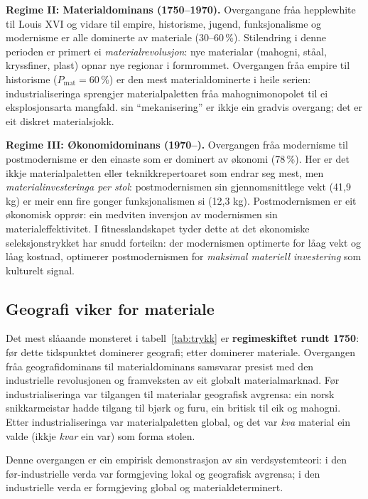 \documentclass[10pt, a4paper, twocolumn]{article}
\begin{document}
\textbf{Regime II: Materialdominans (1750--1970).} Overgangane fr\r{a}a hepplewhite til Louis XVI og vidare til empire, historisme, jugend, funksjonalisme og modernisme er alle dominerte av materiale (30--60\,\%). Stilendring i denne perioden er primert ei \emph{materialrevolusjon}: nye materialar (mahogni, st\r{a}al, kryssfiner, plast) opnar nye regionar i formrommet. Overgangen fr\r{a}a empire til historisme ($P_{\text{mat}} = 60$\,\%) er den mest materialdominerte i heile serien: industrialiseringa sprengjer materialpaletten fr\r{a}a mahognimonopolet til ei eksplosjonsarta mangfald. \citet{giedion1948} sin ``mekanisering'' er ikkje ein gradvis overgang; det er eit diskret materialsjokk.

\textbf{Regime III: \O konomidominans (1970--).} Overgangen fr\r{a}a modernisme til postmodernisme er den einaste som er dominert av \o konomi (78\,\%). Her er det ikkje materialpaletten eller teknikkrepertoaret som endrar seg mest, men \emph{materialinvesteringa per stol}: postmodernismen sin gjennomsnittlege vekt (41{,}9 kg) er meir enn fire gonger funksjonalismen si (12{,}3 kg). Postmodernismen er eit \o konomisk oppr\o r: ein medviten inversjon av modernismen sin materialeffektivitet. I fitnesslandskapet tyder dette at det \o konomiske seleksjonstrykket har snudd forteikn: der modernismen optimerte for l\r{a}ag vekt og l\r{a}ag kostnad, optimerer postmodernismen for \emph{maksimal materiell investering} som kulturelt signal.


\subsection{Geografi viker for materiale}

Det mest sl\r{a}aande monsteret i tabell~\ref{tab:trykk} er \textbf{regimeskiftet rundt 1750}: f\o r dette tidspunktet dominerer geografi; etter dominerer materiale. Overgangen fr\r{a}a geografidominans til materialdominans samsvarar presist med den industrielle revolusjonen og framveksten av eit globalt materialmarknad. F\o r industrialiseringa var tilgangen til materialar geografisk avgrensa: ein norsk snikkarmeistar hadde tilgang til bj\o rk og furu, ein britisk til eik og mahogni. Etter industrialiseringa var materialpaletten global, og det var \emph{kva} material ein valde (ikkje \emph{kvar} ein var) som forma stolen.

Denne overgangen er ein empirisk demonstrasjon av \citet{wallerstein2004} sin verdsystemteori: i den f\o r-industrielle verda var formgjeving lokal og geografisk avgrensa; i den industrielle verda er formgjeving global og materialdeterminert.
\end{document}
